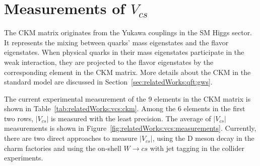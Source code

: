 \section{Measurements of $V_{cs}$ }

The CKM matrix originates from the Yukawa couplings in the SM Higgs sector. It represents the mixing between quarks' mass eigenstates and the flavor eigenstates. When physical quarks in their mass eigenstates participate in the weak interaction, they are projected to the flavor eigenstates by the corresponding element in the CKM matrix. More details about the CKM in the standard model are discussed in Section~\ref{sec:relatedWorks:qft:gws}. 

\begin{table}[ht]
    \centering
    \setlength{\tabcolsep}{1.5em}
    \renewcommand{\arraystretch}{1.5}
    \caption{The current experimental world average of the 9 elements in the CKM matrix in the PDG \cite{pdg2020}.  }
    \label{tab:relatedWorks:vcs:ckm}
\end{table}


The current experimental measurement of the 9 elements in the CKM matrix \cite{pdg2020} is shown in Table~\ref{tab:relatedWorks:vcs:ckm}. Among the 6 elements in the first two rows, $|V_{cs}|$ is measured with the least precision. The average of $|V_{cs}|$ measurements is shown in Figure~\ref{fig:relatedWorks:vcs:measurements}. Currently, there are two direct approaches to measure $|V_{cs}|$, using the D meson decay in the charm factories and using the on-shell $W\to c s$  with jet tagging in the collider experiments.

